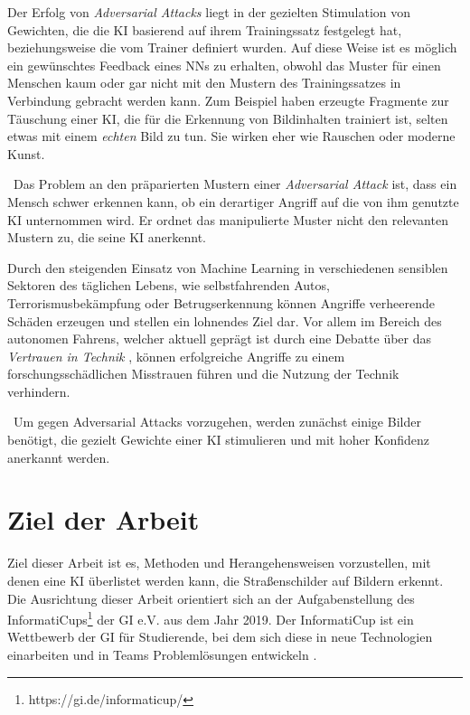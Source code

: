 Der Erfolg von \textit{Adversarial Attacks} liegt in der gezielten Stimulation von Gewichten, die die \ac{KI} basierend auf ihrem Trainingssatz festgelegt hat, beziehungsweise die vom Trainer definiert wurden. Auf diese Weise ist es möglich ein gewünschtes Feedback eines \acs{NN}s zu erhalten, obwohl das Muster für einen Menschen kaum oder gar nicht mit den Mustern des Trainingssatzes in Verbindung gebracht werden kann. Zum Beispiel haben erzeugte Fragmente zur Täuschung einer \ac{KI}, die für die Erkennung von Bildinhalten trainiert ist, selten etwas mit einem \textit{echten} Bild zu tun. Sie wirken eher wie Rauschen oder moderne Kunst. 

~\newline Das Problem an den präparierten Mustern einer \textit{Adversarial Attack} ist, dass ein Mensch schwer erkennen kann, ob ein derartiger Angriff auf die von ihm genutzte \ac{KI} unternommen wird. Er ordnet das manipulierte Muster nicht den relevanten Mustern zu, die seine \ac{KI} anerkennt.

Durch den steigenden Einsatz von Machine Learning in verschiedenen sensiblen Sektoren des täglichen Lebens, wie selbstfahrenden Autos, Terrorismusbekämpfung oder Betrugserkennung können Angriffe verheerende Schäden erzeugen und stellen ein lohnendes Ziel dar. Vor allem im Bereich des autonomen Fahrens, welcher aktuell geprägt ist durch eine Debatte über das \textit{Vertrauen in Technik} \cite{VertrauenTechnik}, können erfolgreiche Angriffe zu einem forschungsschädlichen Misstrauen führen und die Nutzung der Technik verhindern. 

~\newline Um gegen Adversarial Attacks vorzugehen, werden zunächst einige Bilder benötigt, die gezielt Gewichte einer \ac{KI} stimulieren und mit hoher Konfidenz anerkannt werden.

\section{Ziel der Arbeit}
\label{sec:ZielDerArbeit}
Ziel dieser Arbeit ist es, Methoden und Herangehensweisen vorzustellen, mit denen eine \ac{KI} überlistet werden kann, die Straßenschilder auf Bildern erkennt. Die Ausrichtung dieser Arbeit orientiert sich an der Aufgabenstellung des InformatiCups\footnote{https://gi.de/informaticup/} der \ac{GI} e.V. aus dem Jahr 2019. Der InformatiCup ist ein Wettbewerb der \ac{GI} für Studierende, bei dem sich diese in neue Technologien einarbeiten und in Teams Problemlösungen entwickeln \cite{gesellschaft_fur_informatik_e.v._informaticup2019-irrbilder.pdf_2018}.

